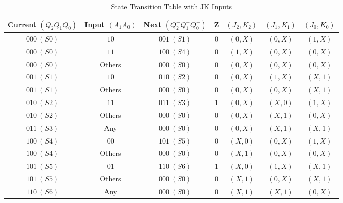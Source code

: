 \documentclass[table ]{article}
\begin{document}
\begin{table}[H]
    \centering
    \renewcommand{\arraystretch}{1.5}
    \begin{tabular}{|c|c|c|c|c|c|c|}
    \hline
    \textbf{Current} $(Q_2 Q_1 Q_0)$ & \textbf{Input} $(A_1 A_0)$ & \textbf{Next} $(Q_2^+ Q_1^+ Q_0^+)$ & \textbf{Z} & $(J_2, K_2)$ & $(J_1, K_1)$ & $(J_0, K_0)$ \\ \hline
    $000~(S0)$ & $10$ & $001~(S1)$ & $0$ & $(0, X)$ & $(0, X)$ & $(1, X)$ \\ \hline
    $000~(S0)$ & $11$ & $100~(S4)$ & $0$ & $(1, X)$ & $(0, X)$ & $(0, X)$ \\ \hline
    $000~(S0)$ & Others & $000~(S0)$ & $0$ & $(0, X)$ & $(0, X)$ & $(0, X)$ \\ \hline
    $001~(S1)$ & $10$ & $010~(S2)$ & $0$ & $(0, X)$ & $(1, X)$ & $(X, 1)$ \\ \hline
    $001~(S1)$ & Others & $000~(S0)$ & $0$ & $(0, X)$ & $(0, X)$ & $(X, 1)$ \\ \hline
    $010~(S2)$ & $11$ & $011~(S3)$ & $1$ & $(0, X)$ & $(X, 0)$ & $(1, X)$ \\ \hline
    $010~(S2)$ & Others & $000~(S0)$ & $0$ & $(0, X)$ & $(X, 1)$ & $(0, X)$ \\ \hline
    $011~(S3)$ & Any & $000~(S0)$ & $0$ & $(0, X)$ & $(X, 1)$ & $(X, 1)$ \\ \hline
    $100~(S4)$ & $00$ & $101~(S5)$ & $0$ & $(X, 0)$ & $(0, X)$ & $(1, X)$ \\ \hline
    $100~(S4)$ & Others & $000~(S0)$ & $0$ & $(X, 1)$ & $(0, X)$ & $(0, X)$ \\ \hline
    $101~(S5)$ & $01$ & $110~(S6)$ & $1$ & $(X, 0)$ & $(1, X)$ & $(X, 1)$ \\ \hline
    $101~(S5)$ & Others & $000~(S0)$ & $0$ & $(X, 1)$ & $(0, X)$ & $(X, 1)$ \\ \hline
    $110~(S6)$ & Any & $000~(S0)$ & $0$ & $(X, 1)$ & $(X, 1)$ & $(0, X)$ \\ \hline
    \end{tabular}
    \caption{State Transition Table with JK Inputs}
    \label{tab:state-transition}
    \end{table}
    
\end{document}
